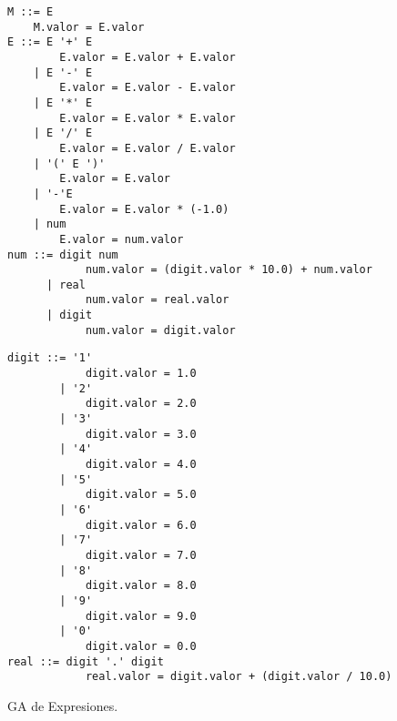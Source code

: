 \documentclass[runningheads,a4paper]{llncs}
\begin{document}
\begin{figure}
\vspace{-0.5cm}
\begin{minipage}{0.47\textwidth}
\begin{center} 
\begin{lstlisting}[columns=fullflexible, backgroundcolor=\color{white}]
M ::= E
    M.valor = E.valor
E ::= E '+' E
		E.valor = E.valor + E.valor 
    | E '-' E
        E.valor = E.valor - E.valor 
    | E '*' E
        E.valor = E.valor * E.valor 
    | E '/' E
        E.valor = E.valor / E.valor 
    | '(' E ')'
        E.valor = E.valor 
    | '-'E
        E.valor = E.valor * (-1.0)
    | num
        E.valor = num.valor
num ::= digit num
            num.valor = (digit.valor * 10.0) + num.valor
	  | real
            num.valor = real.valor
      | digit
            num.valor = digit.valor
\end{lstlisting} 
\end{center}
\end{minipage}
\hspace{0.28cm}\begin{minipage}{0.49\textwidth}
\begin{center}
\begin{lstlisting}[columns=fullflexible, backgroundcolor=\color{white}]
digit ::= '1'
            digit.valor = 1.0
        | '2'
            digit.valor = 2.0
        | '3'
            digit.valor = 3.0
        | '4'
            digit.valor = 4.0
        | '5'
            digit.valor = 5.0
        | '6'
            digit.valor = 6.0
        | '7'
            digit.valor = 7.0
        | '8'
            digit.valor = 8.0
        | '9'
            digit.valor = 9.0
        | '0'
            digit.valor = 0.0
real ::= digit '.' digit
            real.valor = digit.valor + (digit.valor / 10.0)
\end{lstlisting} 
\end{center}
\end{minipage}
\vspace{-0,5cm}
\caption{\label{fig:eje_expresion} GA de Expresiones.}
\end{figure}
\end{document}
